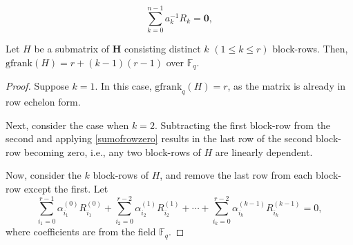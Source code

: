 \documentclass[10pt,a4paper]{amsart}
\begin{document}
\begin{equation}\label{sumofrowzero}
  \sum_{k=0}^{n-1} a_k^{-1} R_k = \mathbf{0},
\end{equation}

\begin{theorem}\label{theorem1}
	Let $H$ be a submatrix of $\mathbf{H}$ consisting distinct $k$ $(1\leq k\leq r)$ block-rows. Then, $\mathrm{gfrank}(H)=r+(k-1)(r-1)$ over $\mathbb{F}_{q}$.
\end{theorem}

\begin{proof} Suppose  $k = 1.$ In this case, $\mathrm{gfrank}_{q}(H) = r$, as the matrix is already in row echelon form.

Next, consider the case when \( k = 2 \). Subtracting the first block-row from the second and applying \eqref{sumofrowzero} results in the last row of the second block-row becoming zero, i.e., any two block-rows  of $H$ are linearly dependent.

Now, consider the $k$ block-rows of $H$, and remove the last row from each block-row except the first. Let
\begin{equation} \label{linearcombi}
			\sum_{i_{1}=0}^{r-1}\alpha_{i_{1}}^{(0)}R^{(0)}_{i_{1}}+\sum_{i_{2}=0}^{r-2}\alpha_{i_{2}}^{(1)}R^{(1)}_{i_{2}}+\cdots+\sum_{i_{k}=0}^{r-2}\alpha_{i_{k}}^{(k-1)}R^{(k-1)}_{i_{k}}=0,
		\end{equation}
        where coefficients are from the field $\mathbb{F}_{q}$. 
        

\end{proof}
\end{document}
